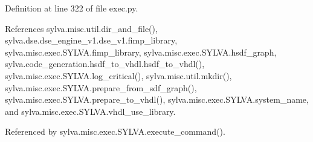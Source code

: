 Definition at line 322 of file exec.\+py.



References sylva.\+misc.\+util.\+dir\+\_\+and\+\_\+file(), sylva.\+dse.\+dse\+\_\+engine\+\_\+v1.\+dse\+\_\+v1.\+fimp\+\_\+library, sylva.\+misc.\+exec.\+S\+Y\+L\+V\+A.\+fimp\+\_\+library, sylva.\+misc.\+exec.\+S\+Y\+L\+V\+A.\+hsdf\+\_\+graph, sylva.\+code\+\_\+generation.\+hsdf\+\_\+to\+\_\+vhdl.\+hsdf\+\_\+to\+\_\+vhdl(), sylva.\+misc.\+exec.\+S\+Y\+L\+V\+A.\+log\+\_\+critical(), sylva.\+misc.\+util.\+mkdir(), sylva.\+misc.\+exec.\+S\+Y\+L\+V\+A.\+prepare\+\_\+from\+\_\+sdf\+\_\+graph(), sylva.\+misc.\+exec.\+S\+Y\+L\+V\+A.\+prepare\+\_\+to\+\_\+vhdl(), sylva.\+misc.\+exec.\+S\+Y\+L\+V\+A.\+system\+\_\+name, and sylva.\+misc.\+exec.\+S\+Y\+L\+V\+A.\+vhdl\+\_\+use\+\_\+library.



Referenced by sylva.\+misc.\+exec.\+S\+Y\+L\+V\+A.\+execute\+\_\+command().


